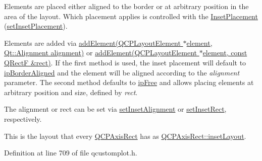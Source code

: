 Elements are placed either aligned to the border or at arbitrary position in the area of the layout. Which placement applies is controlled with the \hyperlink{class_q_c_p_layout_inset_a8b9e17d9a2768293d2a7d72f5e298192}{Inset\-Placement} (\hyperlink{class_q_c_p_layout_inset_a63298830744d5d8c5345511c00fd2144}{set\-Inset\-Placement}).

Elements are added via \hyperlink{class_q_c_p_layout_inset_ad61529eb576af7f04dff94abb10c745a}{add\-Element(\-Q\-C\-P\-Layout\-Element $\ast$element, Qt\-::\-Alignment alignment)} or \hyperlink{class_q_c_p_layout_inset_a8ff61fbee4a1f0ff45c398009d9f1e56}{add\-Element(\-Q\-C\-P\-Layout\-Element $\ast$element, const Q\-Rect\-F \&rect)}. If the first method is used, the inset placement will default to \hyperlink{class_q_c_p_layout_inset_a8b9e17d9a2768293d2a7d72f5e298192aa81e7df4a785ddee2229a8f47c46e817}{ip\-Border\-Aligned} and the element will be aligned according to the {\itshape alignment} parameter. The second method defaults to \hyperlink{class_q_c_p_layout_inset_a8b9e17d9a2768293d2a7d72f5e298192aa4802986ea2cea457f932b115acba59e}{ip\-Free} and allows placing elements at arbitrary position and size, defined by {\itshape rect}.

The alignment or rect can be set via \hyperlink{class_q_c_p_layout_inset_a62882a4f9ad58bb0f53da12fde022abe}{set\-Inset\-Alignment} or \hyperlink{class_q_c_p_layout_inset_aa487c8378a6f9533567a2e6430099dc3}{set\-Inset\-Rect}, respectively.

This is the layout that every \hyperlink{class_q_c_p_axis_rect}{Q\-C\-P\-Axis\-Rect} has as \hyperlink{class_q_c_p_axis_rect_a4114887c7141b59650b7488f930993e5}{Q\-C\-P\-Axis\-Rect\-::inset\-Layout}. 

Definition at line 709 of file qcustomplot.\-h.



